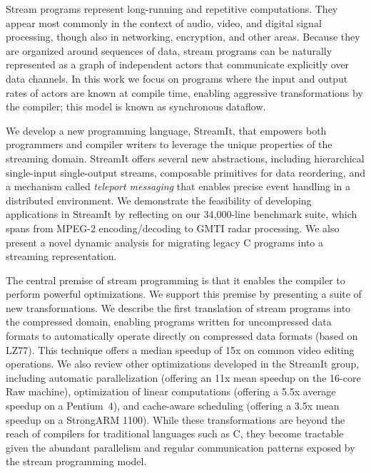 Stream programs represent long-running and repetitive computations.
They appear most commonly in the context of audio, video, and digital
signal processing, though also in networking, encryption, and other
areas.  Because they are organized around sequences of data, stream
programs can be naturally represented as a graph of independent actors
that communicate explicitly over data channels.  In this work we focus
on programs where the input and output rates of actors are known at
compile time, enabling aggressive transformations by the compiler;
this model is known as synchronous dataflow.

We develop a new programming language, StreamIt, that empowers both
programmers and compiler writers to leverage the unique properties of
the streaming domain.  StreamIt offers several new abstractions,
including hierarchical single-input single-output streams, composable
primitives for data reordering, and a mechanism called {\it teleport
messaging} that enables precise event handling in a distributed
environment.  We demonstrate the feasibility of developing
applications in StreamIt by reflecting on our 34,000-line benchmark
suite, which spans from MPEG-2 encoding/decoding to GMTI radar
processing.  We also present a novel dynamic analysis for migrating
legacy C programs into a streaming representation.

The central premise of stream programming is that it enables the
compiler to perform powerful optimizations.  We support this premise
by presenting a suite of new transformations.  We describe the first
translation of stream programs into the compressed domain, enabling
programs written for uncompressed data formats to automatically
operate directly on compressed data formats (based on LZ77).  This
technique offers a median speedup of 15x on common video editing
operations.  We also review other optimizations developed in the
StreamIt group, including automatic parallelization (offering an 11x
mean speedup on the 16-core Raw machine), optimization of linear
computations (offering a 5.5x average speedup on a Pentium~4), and
cache-aware scheduling (offering a 3.5x mean speedup on a StrongARM
1100).  While these transformations are beyond the reach of compilers
for traditional languages such as C, they become tractable given the
abundant parallelism and regular communication patterns exposed by the
stream programming model.
